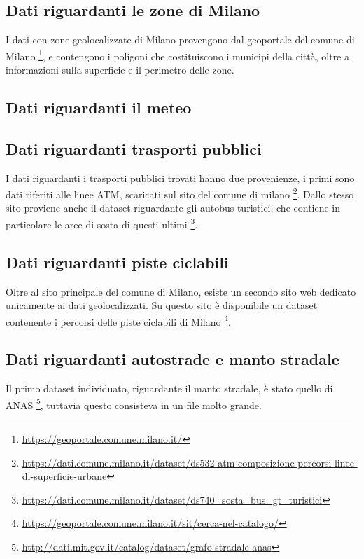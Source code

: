 \documentclass[a4paper]{report}
\begin{document}
\subsection{Dati riguardanti le zone di Milano}

I dati con zone geolocalizzate di Milano provengono dal geoportale del comune di Milano
\footnote{\url{https://geoportale.comune.milano.it/}}, e contengono i poligoni che costituiscono i municipi 
della città, oltre a informazioni sulla superficie e il perimetro delle zone.

\subsection{Dati riguardanti il meteo}

\subsection{Dati riguardanti trasporti pubblici}
I dati riguardanti i trasporti pubblici trovati hanno due provenienze, i primi sono 
dati riferiti alle linee ATM, scaricati sul sito del comune di milano
\footnote{\url{https://dati.comune.milano.it/dataset/ds532-atm-composizione-percorsi-linee-di-superficie-urbane}}.
Dallo stesso sito proviene anche il dataset riguardante gli autobus turistici, che 
contiene in particolare le aree di sosta di questi ultimi
\footnote{\url{https://dati.comune.milano.it/dataset/ds740_sosta_bus_gt_turistici}}.

\subsection{Dati riguardanti piste ciclabili}
Oltre al sito principale del comune di Milano, esiste un secondo sito web dedicato 
unicamente ai dati geolocalizzati. Su questo sito è disponibile un dataset contenente 
i percorsi delle piste ciclabili di Milano
\footnote{\url{https://geoportale.comune.milano.it/sit/cerca-nel-catalogo/}}.

\subsection{Dati riguardanti autostrade e manto stradale}

Il primo dataset individuato, riguardante il manto  stradale, è stato quello di ANAS
\footnote{\url{http://dati.mit.gov.it/catalog/dataset/grafo-stradale-anas}}, 
tuttavia questo consisteva in un file molto grande.
\end{document}
